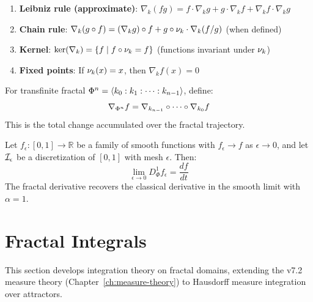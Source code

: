 \begin{proposition}
\label{prop:noetic-deriv-props}
\begin{enumerate}[label=(\roman*)]
  \item \textbf{Leibniz rule (approximate)}: $\nabla_k(fg) = f \cdot \nabla_k g + g \cdot \nabla_k f + \nabla_k f \cdot \nabla_k g$
  \item \textbf{Chain rule}: $\nabla_k(g \circ f) = (\nabla_k g) \circ f + g \circ \nu_{k} \cdot \nabla_k(f/g)$ (when defined)
  \item \textbf{Kernel}: $\ker(\nabla_k) = \{f \mid f \circ \nu_{k} = f\}$ (functions invariant under $\nu_{k}$)
  \item \textbf{Fixed points}: If $\nu_{k}(x) = x$, then $\nabla_k f(x) = 0$
\end{enumerate}
\end{proposition}

\begin{definition}
\label{def:composite-noetic-deriv}
For transfinite fractal $\Phi^{n} = \langle k_0 : k_1 : \cdots : k_{n-1} \rangle$, define:
\[
\nabla_{\Phi^{n}} f = \nabla_{k_{n-1}} \circ \cdots \circ \nabla_{k_0} f
\]
This is the total change accumulated over the fractal trajectory.
\end{definition}

\begin{theorem}
\label{thm:math-classical-limit}
Let $f_\epsilon : [0,1] \to \mathbb{R}$ be a family of smooth functions with $f_\epsilon \to f$ as $\epsilon \to 0$, and let $\mathcal{I}_\epsilon$ be a discretization of $[0,1]$ with mesh $\epsilon$. Then:
\[
\lim_{\epsilon \to 0} D^1_\Phi f_\epsilon = \frac{df}{dt}
\]
The fractal derivative recovers the classical derivative in the smooth limit with $\alpha = 1$.
\end{theorem}

\section{Fractal Integrals}
\label{sec:fractal-integrals}

\begin{tcolorbox}[colback=blue!5!white,colframe=blue!75!black,title=\vnewthree]
This section develops integration theory on fractal domains, extending the v7.2 measure theory (Chapter~\ref*{ch:measure-theory}) to Hausdorff measure integration over attractors.
\end{tcolorbox}

